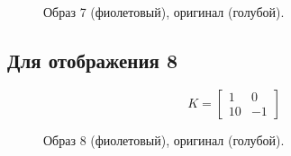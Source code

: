 \documentclass[a5paper, 10pt]{article}
\theoremstyle{definition}
\theoremstyle{plain}
\theoremstyle{remark}
\begin{document}
\begin{figure}[h]
\caption{Образ 7 (фиолетовый), оригинал (голубой).}
\end{figure}

\newpage
\subsection{Для отображения 8}
\begin{equation}
K =
\begin{bmatrix}
1 & 0\\
10 & -1
\end{bmatrix}
\end{equation}

\begin{figure}[h]
\caption{Образ 8 (фиолетовый), оригинал (голубой).}
\end{figure}
\end{document}
